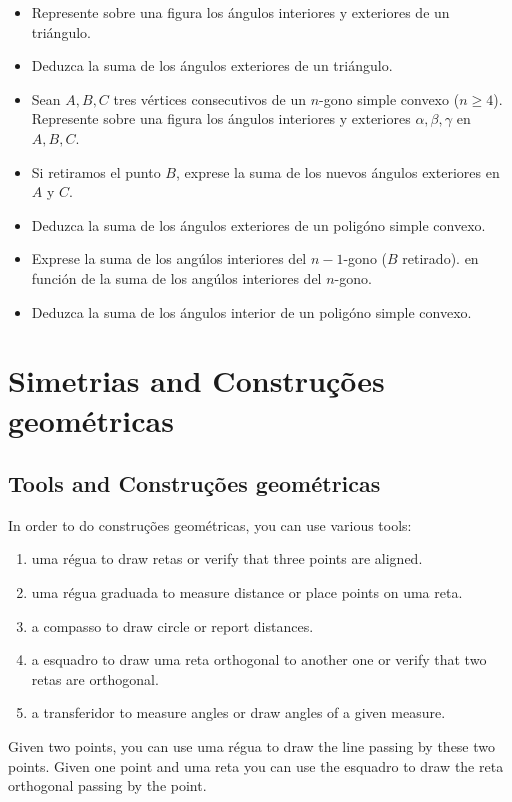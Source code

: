 \begin{itemize}
\item Represente sobre una figura los ángulos interiores y exteriores de
  un triángulo.
\item Deduzca la suma de los ángulos exteriores de un triángulo.
\item Sean $A, B, C$ tres vértices consecutivos de un $n$-gono
  simple convexo ($n \geq 4$).
  Represente sobre una figura los ángulos interiores y exteriores
  $\alpha, \beta, \gamma$
  en $A, B, C$.
\item Si retiramos el punto $B$, exprese la suma de los nuevos
  ángulos exteriores en $A$ y $C$.
\item Deduzca la suma de los ángulos exteriores de un poligóno simple convexo.
\item Exprese la suma de los angúlos interiores del $n-1$-gono ($B$ retirado).
  en función de la suma de los angúlos interiores del $n$-gono.
\item Deduzca la suma de los ángulos interior de un poligóno simple convexo.
\end{itemize}

\section{Simetrias and Construções geométricas}

\subsection*{Tools and Construções geométricas}

In order to do construções geométricas, you can use various tools:

\begin{enumerate}
\item uma régua to draw retas or verify that three points are aligned.
\item uma régua graduada to measure distance or place points on uma reta.
\item a compasso to draw circle or report distances.
\item a esquadro to draw uma reta orthogonal to another one or verify that
  two retas are orthogonal.
\item a transferidor to measure angles or draw angles of a given measure.
\end{enumerate}

Given two points, you can use uma régua to draw the line passing by these two
points. Given one point and uma reta you can use the esquadro to draw the reta
orthogonal passing by the point.


